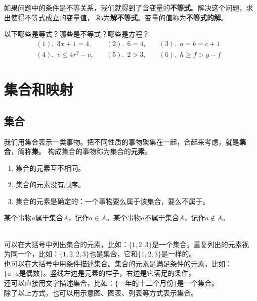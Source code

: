 \documentclass[12pt,UTF8,fontset=none]{ctexbook}
\begin{document}
如果问题中的条件是不等关系，我们就得到了含变量的\textbf{不等式}。解决这个问题，求出使得不等式成立的变量值，
称为\textbf{解不等式}。变量的值称为\textbf{不等式的解}。

\begin{xt}\label{xt:1-2-0}
    以下哪些是等式？哪些是不等式？哪些是方程？
    $$
    \begin{array}{lll}
        (1). \,\,\, 3x + 1 = 4, \quad & (2). \,\,\, 6 = 4, \quad & (3). \,\,\, a = b = c+1  \\
        (4). \,\,\, v \leqslant 4r^2 - v, \quad & (5). \,\,\, 2 > 3, \quad & (6). \,\,\, h \geqslant f > g - f 
    \end{array}
    $$
\end{xt}

\chapter{集合和映射}
\section{集合}
我们用集合表示一类事物。把不同性质的事物聚集在一起，合起来考虑，就是\textbf{集合}，简称\textbf{集}。
构成集合的事物称为集合的\textbf{元素}。
\begin{enumerate}
    \item 集合的元素互不相同。
    \item 集合的元素没有顺序。
    \item 集合的元素是确定的：一个事物要么属于该集合，要么不属于。
\end{enumerate}

某个事物$a$属于集合$A$，记作$a\in A$。某个事物$a$不属于集合$A$，记作$a\notin A$。

\begin{ex}\label{ex:2-0-0}
    \mbox{} \\ 
    \indent 可以在大括号中列出集合的元素，比如：$\{1,2,3\}$是一个集合。重复列出的元素视为同一个，比如：$\{1,2,2,3\}$也是集合，它和$\{1,2,3\}$是一样的。 \\
    \indent 也可以在大括号中用条件描述集合。集合的元素是满足条件的元素，比如：$\{ a\, |\, a\mbox{是偶数}\}$。竖线左边是元素的样子，右边是它满足的条件。\\
    \indent 还可以直接用文字描述集合，比如：$\{\mbox{一年的十二个月份}\}$是一个集合。\\
    \indent 除了以上方式，也可以用示意图、图表、列表等方式表示集合。
\end{ex}
\end{document}
